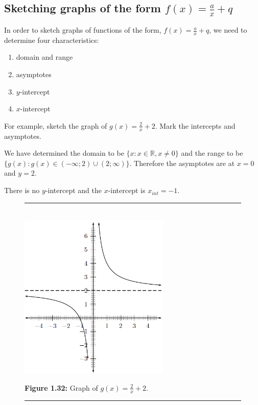 \subsection*{Sketching graphs of the form $f(x)=\frac{a}{x}+q$}
\nopagebreak
In order to sketch graphs of functions of the form, $f(x)=\frac{a}{x}+q$, we need to determine four characteristics:\par 
\begin{enumerate}[noitemsep, label=\textbf{\arabic*}. ] 
\item domain and range
\item asymptotes
\item $y$-intercept
\item $x$-intercept
\end{enumerate}
For example, sketch the graph of $g(x)=\frac{2}{x}+2$. Mark the intercepts and asymptotes.\par 
We have determined the domain to be $\{x:x\in \mathbb{R},x\ne 0\}$ and the range to be $\{g(x):g(x)\in (-\infty ;2)\cup (2;\infty )\}$. Therefore the asymptotes are at $x=0$ and $y=2$.\par 
There is no $y$-intercept and the $x$-intercept is ${x}_{int}=-1$.\par 
\setcounter{subfigure}{0}
\begin{figure}[H] %
\begin{center}
\rule[.1in]{\figurerulewidth}{.005in} \\
\label{m39341*uid162!!!underscore!!!media}\label{m39341*uid162!!!underscore!!!printimage}\includegraphics[height=300px]{col11306.imgs/m39341_MG10C11_026.png} %
\vspace{2pt}
\vspace{\rubberspace}\par \begin{cnxcaption}
\small \textbf{Figure 1.32: }Graph of $g(x)=\frac{2}{x}+2$.
\end{cnxcaption}
\vspace{.1in}
\rule[.1in]{\figurerulewidth}{.005in} \\
\end{center}
\end{figure}       

